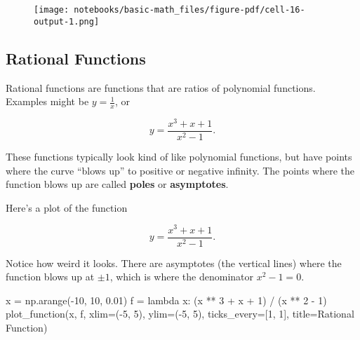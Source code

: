 \documentclass[
  letterpaper,
  DIV=11,
  numbers=noendperiod]{scrreprt}
\newenvironment{Shaded}{\begin{snugshade}}{\end{snugshade}}
\newcommand{\DecValTok}[1]{\textcolor[rgb]{0.68,0.00,0.00}{#1}}
\newcommand{\FloatTok}[1]{\textcolor[rgb]{0.68,0.00,0.00}{#1}}
\newcommand{\KeywordTok}[1]{\textcolor[rgb]{0.00,0.23,0.31}{#1}}
\newcommand{\NormalTok}[1]{\textcolor[rgb]{0.00,0.23,0.31}{#1}}
\newcommand{\OperatorTok}[1]{\textcolor[rgb]{0.37,0.37,0.37}{#1}}
\newcommand{\StringTok}[1]{\textcolor[rgb]{0.13,0.47,0.30}{#1}}
\begin{document}
\begin{figure}[H]

{\centering \texttt{[image: notebooks/basic-math\_files/figure-pdf/cell-16-output-1.png]}

}

\end{figure}

\hypertarget{rational-functions}{%
\subsection{Rational Functions}\label{rational-functions}}

Rational functions are functions that are ratios of polynomial
functions. Examples might be \(y=\frac{1}{x}\), or

\[y=\frac{x^3+x+1}{x^2-1}.\]

These functions typically look kind of like polynomial functions, but
have points where the curve ``blows up'' to positive or negative
infinity. The points where the function blows up are called
\textbf{poles} or \textbf{asymptotes}.

Here's a plot of the function

\[y=\frac{x^3+x+1}{x^2-1}.\]

Notice how weird it looks. There are asymptotes (the vertical lines)
where the function blows up at \(\pm 1\), which is where the denominator
\(x^2-1=0\).

\begin{Shaded}
\begin{Highlighting}[]
\NormalTok{x }\OperatorTok{=}\NormalTok{ np.arange(}\OperatorTok{{-}}\DecValTok{10}\NormalTok{, }\DecValTok{10}\NormalTok{, }\FloatTok{0.01}\NormalTok{)}
\NormalTok{f }\OperatorTok{=} \KeywordTok{lambda}\NormalTok{ x: (x }\OperatorTok{**} \DecValTok{3} \OperatorTok{+}\NormalTok{ x }\OperatorTok{+} \DecValTok{1}\NormalTok{) }\OperatorTok{/}\NormalTok{ (x }\OperatorTok{**} \DecValTok{2} \OperatorTok{{-}} \DecValTok{1}\NormalTok{)}
\NormalTok{plot\_function(x, f, xlim}\OperatorTok{=}\NormalTok{(}\OperatorTok{{-}}\DecValTok{5}\NormalTok{, }\DecValTok{5}\NormalTok{), ylim}\OperatorTok{=}\NormalTok{(}\OperatorTok{{-}}\DecValTok{5}\NormalTok{, }\DecValTok{5}\NormalTok{), ticks\_every}\OperatorTok{=}\NormalTok{[}\DecValTok{1}\NormalTok{, }\DecValTok{1}\NormalTok{], }
\NormalTok{              title}\OperatorTok{=}\StringTok{\textquotesingle{}Rational Function\textquotesingle{}}\NormalTok{)}
\end{Highlighting}
\end{Shaded}
\end{document}
